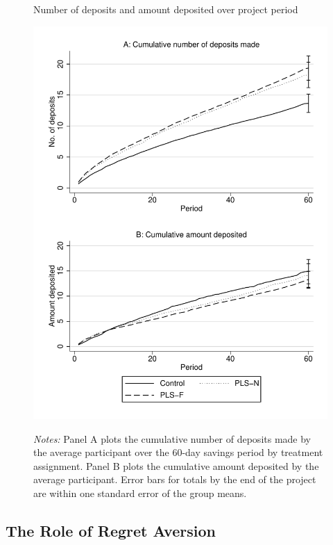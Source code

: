 \documentclass[12pt, titlepage]{article}
\begin{document}
		\begin{figure}[ht]
			\caption{Number of deposits and amount deposited over project period}
			\includegraphics[height=0.85\textheight]{../../figures/line-cumdeposits.pdf}
			\label{fig:line-cumdeposits}
			\caption*{\footnotesize \emph{Notes:} Panel A plots the cumulative number of deposits made by the average participant over the 60-day savings period by treatment assignment. Panel B plots the cumulative amount deposited by the average participant. Error bars for totals by the end of the project are within one standard error of the group means.}
		\end{figure}

		\clearpage

	\subsection{The Role of Regret Aversion} \label{sec:mechanisms}
\end{document}
